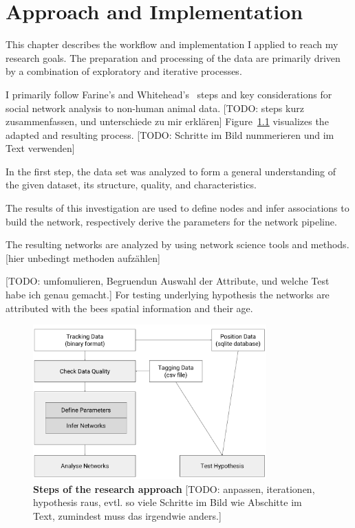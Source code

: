 \chapter{Approach and Implementation}
\label{ch:approach}

This chapter describes the workflow and implementation I applied to reach my research goals.
The preparation and processing of the data are primarily driven by a combination of exploratory and iterative processes.

I primarily follow  Farine's and Whitehead's~\cite{farine2015constructing} steps and key considerations for social network analysis to non-human animal data.
[TODO: steps kurz zusammenfassen, und unterschiede zu mir erklären]
Figure~\ref{fig:process} visualizes the adapted and resulting process.
[TODO: Schritte im Bild nummerieren und im Text verwenden]

In the first step, the data set was analyzed to form a general understanding of the given dataset, its structure, quality, and characteristics.

The results of this investigation are used to define nodes and infer associations to build the network, respectively derive the parameters for the network pipeline.

The resulting networks are analyzed by using network science tools and methods.
[hier unbedingt methoden aufzählen]																																																																																																						

[TODO: umfomulieren, Begruendun Auswahl der Attribute, und welche Test habe ich genau gemacht.]
For testing underlying hypothesis the networks are attributed with the bees spatial information and their age.

\begin{figure}[htb]
	\centering
	\includegraphics[width=0.8\textwidth]{Figures/process}
	\caption[Steps of the research approach]{\textbf{Steps of the research approach} [TODO: anpassen, iterationen, hypothesis raus, evtl. so viele Schritte im Bild wie Abschitte im Text, zumindest muss das irgendwie anders.]}
	\label{fig:process}
\end{figure}




